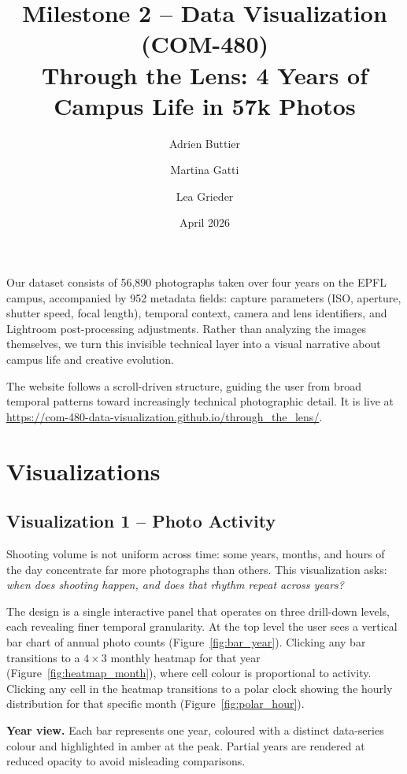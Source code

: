 \documentclass{article}
\title{\textbf{Milestone 2 -- Data Visualization (COM-480)}\\[0.4em]
\large Through the Lens: 4 Years of Campus Life in 57k Photos}
\author{Adrien Buttier \and Martina Gatti \and Lea Grieder}
\date{April 2026}
\begin{document}
\maketitle

\noindent
Our dataset consists of 56{,}890 photographs taken over four years on the EPFL campus, accompanied by 952 metadata fields: capture parameters (ISO, aperture, shutter speed, focal length), temporal context, camera and lens identifiers, and Lightroom post-processing adjustments. Rather than analyzing the images themselves, we turn this invisible technical layer into a visual narrative about campus life and creative evolution.

The website follows a scroll-driven structure, guiding the user from broad temporal patterns toward increasingly technical photographic detail. It is live at \url{https://com-480-data-visualization.github.io/through_the_lens/}.

\section{Visualizations}

\subsection{Visualization 1 -- Photo Activity}

Shooting volume is not uniform across time: some years, months, and hours of the day concentrate far more photographs than others.
This visualization asks: \textit{when does shooting happen, and does that rhythm repeat across years?}

The design is a single interactive panel that operates on three drill-down levels, each revealing finer temporal granularity.
At the top level the user sees a vertical bar chart of annual photo counts (Figure~\ref{fig:bar_year}).
Clicking any bar transitions to a $4{\times}3$ monthly heatmap for that year (Figure~\ref{fig:heatmap_month}), where cell colour is proportional to activity.
Clicking any cell in the heatmap transitions to a polar clock showing the hourly distribution for that specific month (Figure~\ref{fig:polar_hour}).

\medskip
\noindent\textbf{Year view.}
Each bar represents one year, coloured with a distinct data-series colour and highlighted in amber at the peak.
Partial years are rendered at reduced opacity to avoid misleading comparisons.
\end{document}
